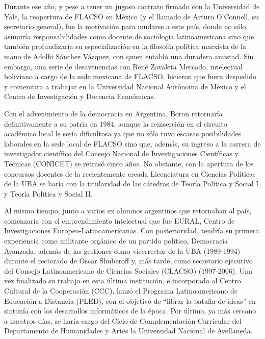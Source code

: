 Durante ese año, y pese a tener un jugoso contrato firmado con la Universidad de Yale, la reapertura de FLACSO en México (y el llamado de Arturo O'Connell, su secretario general), fue la motivación para mudarse a este país, donde no sólo asumiría responsabilidades como docente de sociología latinoamericana sino que también profundizaría su especialización en la filosofía política marxista de la mano de Adolfo Sánchez Vázquez, con quien entabló una duradera amistad. Sin embargo, una serie de desavenencias con René Zavaleta Mercado, intelectual boliviano a cargo de la sede mexicana de FLACSO, hicieron que fuera despedido y comenzara a trabajar en la Universidad Nacional Autónoma de México y el Centro de Investigación y Docencia Económicas.

Con el advenimiento de la democracia en Argentina, Boron retornaría definitivamente a su patria en 1984, aunque la reinserción en el circuito académico local le sería dificultosa ya que no sólo tuvo escasas posibilidades laborales en la sede local de FLACSO sino que, además, su ingreso a la carrera de investigador científico del Consejo Nacional de Investigaciones Científicas y Técnicas (CONICET) se retrasó cinco años. No obstante, con la apertura de los concursos docentes de la recientemente creada Licenciatura en Ciencias Políticas de la UBA se haría con la titularidad de las cátedras de Teoría Política y Social I y Teoría Política y Social II.

Al mismo tiempo, junto a varios ex alumnos argentinos que retornaban al país, comenzaría con el emprendimiento intelectual que fue EURAL, Centro de Investigaciones Europeo-Latinoamericanas. Con posterioridad, tendría su primera experiencia como militante orgánico de un partido político, Democracia Avanzada, además de las gestiones como vicerrector de la UBA (1989-1994) durante el rectorado de Oscar Shuberoff y, más tarde, como secretario ejecutivo del Consejo Latinoamericano de Ciencias Sociales (CLACSO) (1997-2006). Una vez finalizado su trabajo en esta última institución, e incorporado al Centro Cultural de la Cooperación (CCC), lanzó el Programa Latinoamericano de Educación a Distancia (PLED), con el objetivo de ``librar la batalla de ideas'' en sintonía con los desarrollos informáticos de la época. Por último, ya más cercano a nuestros días, se haría cargo del Ciclo de Complementación Curricular del Departamento de Humanidades y Artes la Universidad Nacional de Avellaneda.

